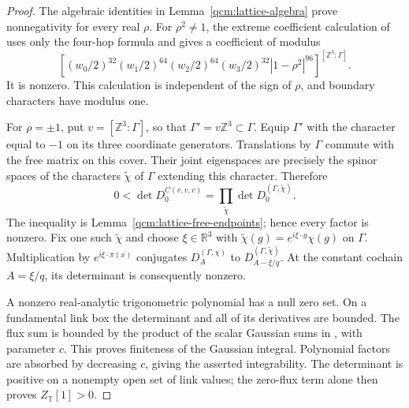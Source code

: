 \documentclass[11pt,letterpaper,reqno]{amsart}
\theoremstyle{definition}
\begin{document}
\begin{proof}
The algebraic identities in Lemma~\ref{qcm:lattice-algebra} prove
nonnegativity for every real $\rho$. For $\rho^2\ne1$, the extreme
coefficient calculation of
\cite[Proposition~2.2, equations~(2.19)--(2.21)]{QEDConstruction}
uses only the four-hop formula and gives a coefficient of modulus
\[
 \left[
 (w_0/2)^{32}(w_1/2)^{64}(w_2/2)^{64}(w_3/2)^{32}
                         |1-\rho^2|^{96}\right]^{[\mathbb Z^3:\Gamma]}.
\]
It is nonzero. This calculation is independent of the sign of
$\rho$, and boundary characters have modulus one.

For $\rho=\pm1$, put $v=[\mathbb Z^3:\Gamma]$, so that
$\Gamma'=v\mathbb Z^3\subset\Gamma$. Equip $\Gamma'$ with the
character equal to $-1$ on its three coordinate generators.
Translations by $\Gamma$ commute with the free matrix on this
cover. Their joint eigenspaces are precisely the spinor spaces of
the characters $\widetilde\chi$ of $\Gamma$ extending this
character. Therefore
\[
 0<\det D_0^{C(v,v,v)}
     =\prod_{\widetilde\chi}\det D_0^{(\Gamma,\widetilde\chi)}.
\]
The inequality is Lemma~\ref{qcm:lattice-free-endpoints}; hence every
factor is nonzero. Fix one such $\widetilde\chi$ and choose
$\xi\in\mathbb R^3$ with
$\widetilde\chi(g)=e^{i\xi\cdot g}\chi(g)$ on $\Gamma$.
Multiplication by $e^{i\xi\cdot\pi(x)}$ conjugates
$D_A^{(\Gamma,\chi)}$ to
$D_{A-\xi/q}^{(\Gamma,\widetilde\chi)}$. At the constant cochain
$A=\xi/q$, its determinant is consequently nonzero.

A nonzero real-analytic trigonometric polynomial has a null zero
set. On a fundamental link box the determinant and all of its
derivatives are bounded. The flux sum is bounded by the product of
the scalar Gaussian sums in
\cite[equation~(2.5)]{QEDConstruction}, with parameter $c$.
This proves finiteness of the Gaussian integral. Polynomial factors
are absorbed by decreasing $c$, giving the asserted integrability.
The determinant is positive on a nonempty open set of link values;
the zero-flux term alone then proves $Z_{\mathbb T}[1]>0$.
\end{proof}
\end{document}
